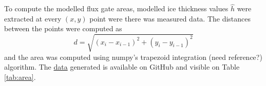 \documentclass[a4, 12pt]{article}
\begin{document}
To compute the modelled flux gate areas, modelled ice thickness values $\hat{h}$ were extracted at every $(x, y)$ point were there was measured data. The distances between the points were computed as
\begin{equation}
d=\sqrt{(x_i - x_{i-1})^2 + (y_i - y_{i-1})^2}
\end{equation}
and the area was computed using numpy's trapezoid integration (need reference?) algorithm. The \href{https://github.com/aleximorin/USRA-2020-AlexiMorin/blob/master/transects_area_GATE_v2.csv}{data} generated is available on GitHub and visible on Table \ref{tab:area}.

\begin{table}[h!]
\centering
\caption{Gate areas computed from GPR data, \citet{farinotti2019consensus} and its scaled model.}
\label{tab:area}
\noindent{}
\end{table}

\FloatBarrier



\end{document}
